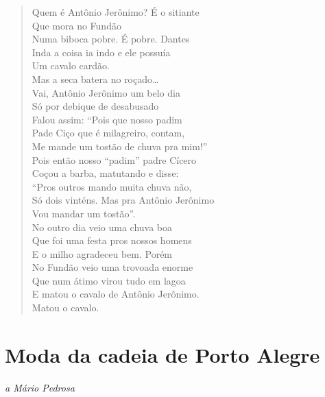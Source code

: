 \begin{verse}
Quem é Antônio Jerônimo? É o sitiante\\
\qquad\quad{}Que mora no Fundão\\
Numa biboca pobre. É pobre. Dantes\\
Inda a coisa ia indo e ele possuía\\
\qquad\quad{}Um cavalo cardão.\\
Mas a seca batera no roçado\ldots{}\\
Vai, Antônio Jerônimo um belo dia\\
Só por debique de desabusado\\
Falou assim: ``Pois que nosso padim\\
Pade Ciço que é milagreiro, contam,\\
Me mande um tostão de chuva pra mim!''\\
Pois então nosso ``padim'' padre Cícero\\
Coçou a barba, matutando e disse:\\
``Pros outros mando muita chuva não,\\
Só dois vinténs. Mas pra Antônio Jerônimo\\
\qquad\quad{}Vou mandar um tostão''.\\
No outro dia veio uma chuva boa\\
Que foi uma festa pros nossos homens\\
E o milho agradeceu bem. Porém\\
No Fundão veio uma trovoada enorme\\
Que num átimo virou tudo em lagoa\\
E matou o cavalo de Antônio Jerônimo.\\
\qquad\quad{}Matou o cavalo.
\end{verse}

\chapter{Moda da cadeia de Porto Alegre}

\begin{flushright}
\emph{a Mário Pedrosa}
\end{flushright}

